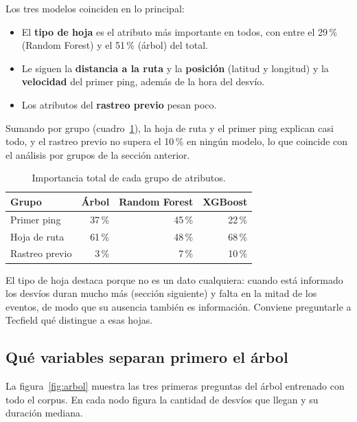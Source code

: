 \documentclass[11pt,a4paper]{article}
\begin{document}
Los tres modelos coinciden en lo principal:

\begin{itemize}[nosep]
  \item El \textbf{tipo de hoja} es el atributo más importante en todos, con entre el 29\,\% (Random Forest) y
  el 51\,\% (árbol) del total.
  \item Le siguen la \textbf{distancia a la ruta} y la \textbf{posición} (latitud y longitud) y la
  \textbf{velocidad} del primer ping, además de la hora del desvío.
  \item Los atributos del \textbf{rastreo previo} pesan poco.
\end{itemize}

Sumando por grupo (cuadro~\ref{tab:imp-grupo}), la hoja de ruta y el primer ping explican casi todo, y el
rastreo previo no supera el 10\,\% en ningún modelo, lo que coincide con el análisis por grupos de la sección
anterior.

\begin{table}[H]
  \centering
  \begin{tabular}{@{}lrrr@{}}
    \toprule
    \textbf{Grupo} & \textbf{Árbol} & \textbf{Random Forest} & \textbf{XGBoost} \\
    \midrule
    Primer ping & 37\,\% & 45\,\% & 22\,\% \\
    Hoja de ruta & 61\,\% & 48\,\% & 68\,\% \\
    Rastreo previo & 3\,\% & 7\,\% & 10\,\% \\
    \bottomrule
  \end{tabular}
  \caption{Importancia total de cada grupo de atributos.}
  \label{tab:imp-grupo}
\end{table}

El tipo de hoja destaca porque no es un dato cualquiera: cuando está informado los desvíos duran mucho más
(sección siguiente) y falta en la mitad de los eventos, de modo que su ausencia también es información.
Conviene preguntarle a Tecfield qué distingue a esas hojas.

\subsection{Qué variables separan primero el árbol}

La figura~\ref{fig:arbol} muestra las tres primeras preguntas del árbol entrenado con todo el corpus.
En cada nodo figura la cantidad de desvíos que llegan y su duración mediana.
\end{document}
